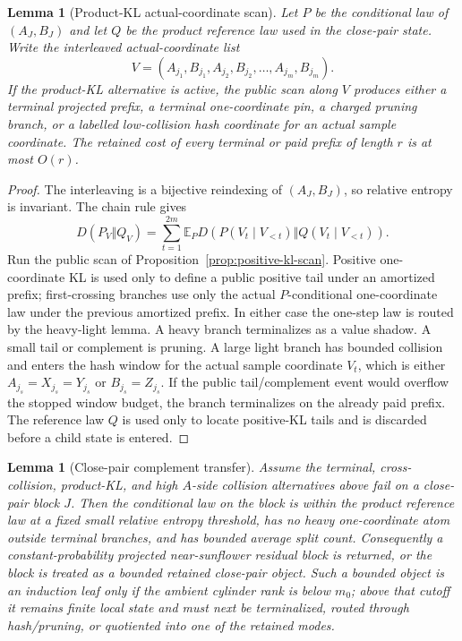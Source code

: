 \documentclass[11pt]{article}
\newtheorem{lemma}[theorem]{Lemma}
\theoremstyle{remark}
\newcommand{\E}{\mathbb E}
\begin{document}
\begin{lemma}[Product-KL actual-coordinate scan]\label{lem:app-kl-first-crossing}
Let $P$ be the conditional law of $(A_J,B_J)$ and let $Q$ be the product reference law used in the close-pair state.  Write the interleaved actual-coordinate list
\[
        V=(A_{j_1},B_{j_1},A_{j_2},B_{j_2},\ldots,A_{j_m},B_{j_m}).
\]
If the product-KL alternative is active, the public scan along $V$ produces either a terminal projected prefix, a terminal one-coordinate pin, a charged pruning branch, or a labelled low-collision hash coordinate for an actual sample coordinate.  The retained cost of every terminal or paid prefix of length $r$ is at most $O(r)$.
\end{lemma}

\begin{proof}
The interleaving is a bijective reindexing of $(A_J,B_J)$, so relative entropy is invariant.  The chain rule gives
\[
        D(P_V\Vert Q_V)=\sum_{t=1}^{2m}\E_P D(P(V_t\mid V_{<t})\Vert Q(V_t\mid V_{<t})).
\]
Run the public scan of Proposition~\ref{prop:positive-kl-scan}.  Positive one-coordinate KL is used only to define a public positive tail under an amortized prefix; first-crossing branches use only the actual $P$-conditional one-coordinate law under the previous amortized prefix.  In either case the one-step law is routed by the heavy-light lemma.  A heavy branch terminalizes as a value shadow.  A small tail or complement is pruning.  A large light branch has bounded collision and enters the hash window for the actual sample coordinate $V_t$, which is either $A_{j_s}=X_{j_s}=Y_{j_s}$ or $B_{j_s}=Z_{j_s}$.  If the public tail/complement event would overflow the stopped window budget, the branch terminalizes on the already paid prefix.  The reference law $Q$ is used only to locate positive-KL tails and is discarded before a child state is entered.
\end{proof}

\begin{lemma}[Close-pair complement transfer]\label{lem:app-complement-transfer}
Assume the terminal, cross-collision, product-KL, and high $A$-side collision
alternatives above fail on a close-pair block $J$.  Then the conditional law on
the block is within the product reference law at a fixed small relative entropy
threshold, has no heavy one-coordinate atom outside terminal branches, and has
bounded average split count.  Consequently a constant-probability projected
near-sunflower residual block is returned, or the block is treated as a bounded
retained close-pair object.  Such a bounded object is an induction leaf only if
the ambient cylinder rank is below $m_0$; above that cutoff it remains finite
local state and must next be terminalized, routed through hash/pruning, or
quotiented into one of the retained modes.
\end{lemma}
\end{document}
